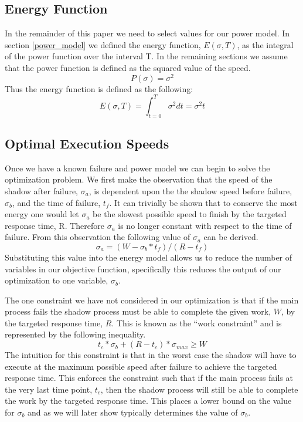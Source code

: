 \subsection{Energy Function}

In the remainder of this paper we need to select values for our power
model. In section \ref{power_model} we defined the energy function,
$E(\sigma, T)$, as the integral of the power function over the
interval T. In the remaining sections we assume that the power
function is defined as the squared value of the speed.
\begin{equation}
P(\sigma)=\sigma^2
\end{equation}
Thus the energy function is defined as the following:
\begin{equation}
E(\sigma,T)=\int_{t=0}^T \sigma^2 dt = \sigma^2t
\end{equation}

\subsection{Optimal Execution Speeds}
\label{finding_execution_speeds}

Once we have a known failure and power model we can begin to solve the
optimization problem. We first make the observation that the speed of
the shadow after failure, $\sigma_a$, is dependent upon the the shadow
speed before failure, $\sigma_b$, and the time of failure, $t_f$. It
can trivially be shown that to conserve the most energy one would let
$\sigma_a$ be the slowest possible speed to finish by the targeted
response time, R. Therefore $\sigma_a$ is no longer constant with
respect to the time of failure. From this observation the following
value of $\sigma_a$ can be derived.
\begin{equation}
\label{optimal_sigma_a}
\sigma_a=(W-\sigma_b*t_f)/(R-t_f)
\end{equation}
Substituting this value into the energy model allows us to reduce the
number of variables in our objective function, specifically this
reduces the output of our optimization to one variable, $\sigma_b$. 

The one constraint we have not considered in our optimization is that
if the main process fails the shadow process must be able to complete
the given work, $W$, by the targeted response time, $R$. This is known
as the ``work constraint'' and is represented by the following
inequality.
\begin{equation}
\label{work_constraint}
t_c*\sigma_b+(R-t_c)*\sigma_{max} \geq W 
\end{equation}
The intuition for this constraint is that in the worst case the shadow
will have to execute at the maximum possible speed after failure to
achieve the targeted response time. This enforces the constraint such
that if the main process fails at the very last time point, $t_c$,
then the shadow process will still be able to complete the work by the
targeted response time. This places a lower bound on the value for
$\sigma_b$ and as we will later show typically determines the value of
$\sigma_b$.

